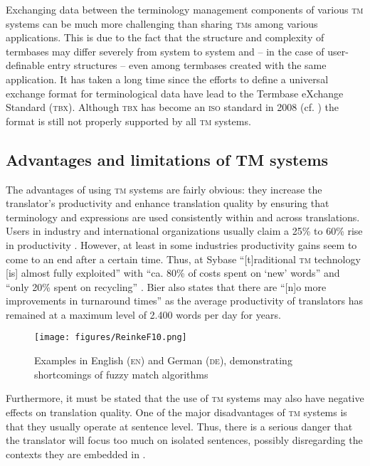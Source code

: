 \documentclass[output=paper]{LSP/langsci}
\begin{document}
Exchanging data between the terminology management components of various \textsc{tm} systems can be much more challenging than sharing \textsc{tm}s among various applications. This is due to the fact that the structure and complexity of termbases may differ severely from system to system and -- in the case of user-definable entry structures -- even among termbases created with the same application. It has taken a long time since the efforts to define a universal exchange format for terminological data have lead to the Termbase eXchange Standard (\textsc{tbx}). Although \textsc{tbx} has become an \textsc{iso} standard in 2008 (cf. \citealt{ISO2008}) the format is still not properly supported by all \textsc{tm} systems.

\subsection{Advantages and limitations of TM systems}\label{sec:reinke:2.6}
 
The advantages of using \textsc{tm} systems are fairly obvious: they increase the translator's productivity and enhance translation quality by ensuring that terminology and expressions are used consistently within and across translations. Users in industry and international organizations usually claim a 25\% to 60\% rise in productivity \citep[113f.]{Reinke2004}. However, at least in some industries productivity gains seem to come to an end after a certain time. Thus, at Sybase ``[t]raditional \textsc{tm} technology [is] almost fully exploited'' with ``ca. 80\% of costs spent on `new' words'' and ``only 20\% spent on recycling'' \citep{Bier2012}. Bier also states that there are ``[n]o more improvements in turnaround times'' as the average productivity of translators has remained at a maximum level of 2.400 words per day for years.
 

\begin{figure}
\texttt{[image: figures/ReinkeF10.png]}
\caption{Examples in English (\textsc{en}) and German (\textsc{de}), demonstrating shortcomings of fuzzy match algorithms \citep[64]{Reinke2006}}
\label{fig:reinke:10}
\end{figure}
 
Furthermore, it must be stated that the use of \textsc{tm} systems may also have negative effects on translation quality. One of the major disadvantages of \textsc{tm} systems is that they usually operate at sentence level. Thus, there is a serious danger that the translator will focus too much on isolated sentences, possibly disregarding the contexts they are embedded in \citep[136f.]{Reinke2004}.
 
\end{document}
